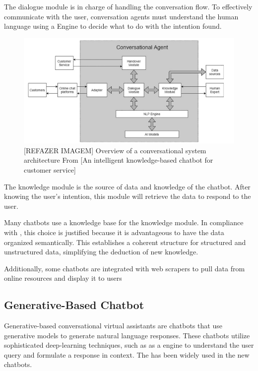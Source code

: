 The dialogue module is in charge of handling the conversation flow. To effectively communicate with the user, conversation agents must understand the human language using a {\nlp} Engine to decide what to do with the intention found. 

\begin{figure}[ht]
    \includegraphics[width=14cm]{figs/chapter2/chatbot_architecture.png}
    \centering
    \caption{[REFAZER IMAGEM] Overview of a conversational system architecture From [An intelligent knowledge-based chatbot for customer service]}
\end{figure}

The knowledge module is the source of data and knowledge of the chatbot. After knowing the user's intention, this module will retrieve the data to respond to the user.

Many chatbots use a knowledge base for the knowledge module. In compliance with \citet{pereira_querying_2023}, this choice is justified because it is advantageous to have the data organized semantically. This establishes a coherent structure for structured and unstructured data, simplifying the deduction of new knowledge.

Additionally, some chatbots are integrated with web scrapers to pull data from online resources and display it to users


\subsection{Generative-Based Chatbot}

Generative-based conversational virtual assistants are chatbots that use generative models to generate natural language responses. These chatbots utilize sophisticated deep-learning techniques, such as {\llm} as a {\nlp} engine to understand the user query and formulate a response in context. The {\llm} has been widely used in the new chatbots.

